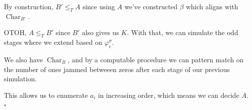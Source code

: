 \documentclass[12pt]{article}
\DeclareMathOperator{\ch}{Char}
\begin{document}
By construction, $B' \le_T A$ since using $A$ we've constructed $\beta$ which aligns with $\ch_{B'}$.

OTOH, $A \le_T B'$ since $B'$ also gives us $K$.
With that, we can simulate the odd stages where we extend based on $\varphi_e^\sigma$.

We also have $\ch_B$, and by a computable procedure we can pattern match
on the number of ones jammed betweeen zeros after each stage of our previous simulation.

This allows us to enumerate $a_i$ in increasing order, which means we can decide $A$. $\square$
\end{document}
